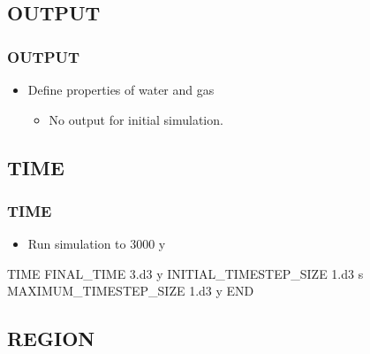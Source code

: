 \documentclass{beamer}
\begin{document}
\subsection{OUTPUT}

\begin{frame}[fragile]\frametitle{OUTPUT}

\begin{itemize}
  \item Define properties of water and gas
  \begin{itemize}
    \item No output for initial simulation.
  \end{itemize}
\end{itemize}

\end{frame}

\subsection{TIME}

\begin{frame}[fragile]\frametitle{TIME}

\begin{itemize}
\item Run simulation to 3000 y
\end{itemize}

\begin{semiverbatim}

TIME
  FINAL_TIME 3.d3 y
  INITIAL_TIMESTEP_SIZE 1.d3 s
  MAXIMUM_TIMESTEP_SIZE 1.d3 y
END

\end{semiverbatim}

\end{frame}

\subsection{REGION}
\end{document}
